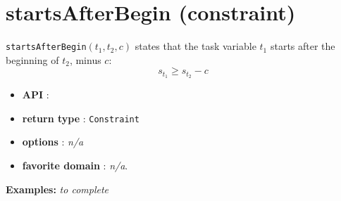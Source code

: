 \section{startsAfterBegin (constraint)}\label{startsafterbegin:startsafterbeginconstraint}\hypertarget{startsafterbegin:startsafterbeginconstraint}{}
\begin{notedef}
  \texttt{startsAfterBegin}$(t_1,t_2,c)$ states that the task variable $t_1$ starts after the beginning of $t_2$, minus $c$:
  $$s_{t_{1}} \ge s_{t_{2}} - c$$
\end{notedef}

\begin{itemize}
	\item \textbf{API} :
	\item \textbf{return type} : \texttt{Constraint}
	\item \textbf{options} : \emph{n/a}
	\item \textbf{favorite domain} : \emph{n/a}.
\end{itemize}

\textbf{Examples:}
%
\emph{to complete}
